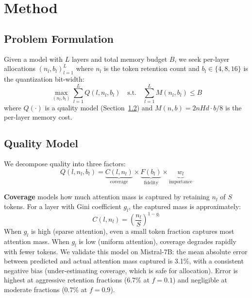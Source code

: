 \documentclass{article}
\newcommand{\nlayers}{L}
\newcommand{\nheads}{H}
\newcommand{\hdim}{d}
\begin{document}
\section{Method}
\label{sec:method}

\subsection{Problem Formulation}
\label{sec:formulation}

Given a model with $\nlayers$ layers and total memory budget $B$, we seek per-layer allocations $(n_l, b_l)_{l=1}^{\nlayers}$ where $n_l$ is the token retention count and $b_l \in \{4, 8, 16\}$ is the quantization bit-width:
\begin{equation}
\max_{(n_l, b_l)} \sum_{l=1}^{\nlayers} Q(l, n_l, b_l) \quad \text{s.t.} \quad \sum_{l=1}^{\nlayers} M(n_l, b_l) \leq B
\label{eq:objective}
\end{equation}
where $Q(\cdot)$ is a quality model (Section~\ref{sec:quality}) and $M(n, b) = 2 n \nheads \hdim \cdot b/8$ is the per-layer memory cost.

\subsection{Quality Model}
\label{sec:quality}

We decompose quality into three factors:
\begin{equation}
Q(l, n_l, b_l) = \underbrace{C(l, n_l)}_{\text{coverage}} \times \underbrace{F(b_l)}_{\text{fidelity}} \times \underbrace{w_l}_{\text{importance}}
\label{eq:quality}
\end{equation}

\textbf{Coverage} models how much attention mass is captured by retaining $n_l$ of $S$ tokens.
For a layer with Gini coefficient $g_l$, the captured mass is approximately:
\begin{equation}
C(l, n_l) = \left(\frac{n_l}{S}\right)^{1 - g_l}
\label{eq:coverage}
\end{equation}
When $g_l$ is high (sparse attention), even a small token fraction captures most attention mass.
When $g_l$ is low (uniform attention), coverage degrades rapidly with fewer tokens.
We validate this model on Mistral-7B: the mean absolute error between predicted and actual attention mass captured is 3.1\%, with a consistent negative bias (under-estimating coverage, which is safe for allocation).
Error is highest at aggressive retention fractions (6.7\% at $f=0.1$) and negligible at moderate fractions (0.7\% at $f=0.9$).
\end{document}

